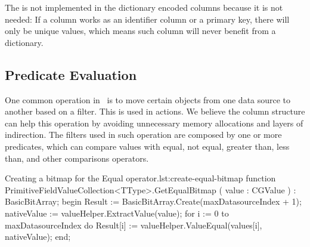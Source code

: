 The  is not implemented in the dictionary encoded columns because it is not needed: If a column works as an identifier column or a primary key, there will only be unique values, which means such column will never benefit from a dictionary.

\subsection{Predicate Evaluation}
\label{sub:Predicate Evaluation}
One common operation in \gap~is to move certain objects from one data source to another based on a filter. This is used in actions. We believe the column structure can help this operation by avoiding unnecessary memory allocations and layers of indirection. The filters used in such operation are composed by one or more predicates, which can compare values with equal, not equal, greater than, less than, and other comparisons operators. 


\begin{delphicode}{Creating a bitmap for the Equal operator.}{lst:create-equal-bitmap}
function PrimitiveFieldValueCollection<TType>.GetEqualBitmap
( value : CGValue )
: BasicBitArray;
begin
  Result := BasicBitArray.Create(maxDatasourceIndex + 1);
  nativeValue := valueHelper.ExtractValue(value);
  for i := 0 to maxDatasourceIndex do
    Result[i] := valueHelper.ValueEqual(values[i], nativeValue);
end;
\end{delphicode}

